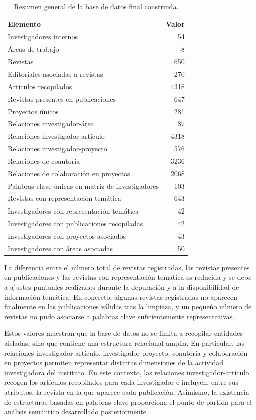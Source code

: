 \documentclass[11pt,spanish,listoffigures,listoftables]{tfgetsinf}
\begin{document}
\begin{table}[H]
\centering
\small
\begin{tabular}{lr}
\toprule
\textbf{Elemento} & \textbf{Valor} \\
\midrule
Investigadores internos & 54 \\
Áreas de trabajo & 8 \\
Revistas & 650 \\
Editoriales asociadas a revistas & 270 \\
Artículos recopilados & 4318 \\
Revistas presentes en publicaciones & 647 \\
Proyectos únicos & 281 \\
Relaciones investigador-área & 87 \\
Relaciones investigador-artículo & 4318 \\
Relaciones investigador-proyecto & 576 \\
Relaciones de coautoría & 3236 \\
Relaciones de colaboración en proyectos & 2068 \\
Palabras clave únicas en matriz de investigadores & 103 \\
Revistas con representación temática & 643 \\
Investigadores con representación temática & 42 \\
Investigadores con publicaciones recopiladas & 42 \\
Investigadores con proyectos asociados & 43 \\
Investigadores con áreas asociadas & 50 \\
\bottomrule
\end{tabular}
\caption{Resumen general de la base de datos final construida.}
\label{tab:resumen_base_datos}
\end{table}

La diferencia entre el número total de revistas registradas, las revistas presentes en publicaciones y las revistas con representación temática es reducida y se debe a ajustes puntuales realizados durante la depuración y a la disponibilidad de información temática. En concreto, algunas revistas registradas no aparecen finalmente en las publicaciones válidas tras la limpieza, y un pequeño número de revistas no pudo asociarse a palabras clave suficientemente representativas.

Estos valores muestran que la base de datos no se limita a recopilar entidades aisladas, sino que contiene una estructura relacional amplia. En particular, las relaciones investigador-artículo, investigador-proyecto, coautoría y colaboración en proyectos permiten representar distintas dimensiones de la actividad investigadora del instituto. En este contexto, las relaciones investigador-artículo recogen los artículos recopilados para cada investigador e incluyen, entre sus atributos, la revista en la que aparece cada publicación. Asimismo, la existencia de estructuras basadas en palabras clave proporciona el punto de partida para el análisis semántico desarrollado posteriormente.
\end{document}
